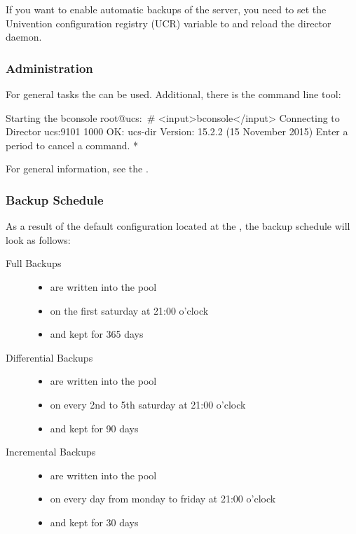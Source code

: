 If you want to enable automatic backups of the server, you need to set the Univention configuration registry (UCR) variable  to  and reload the director daemon.


\subsubsection{Administration}

For general tasks the  can be used.
Additional, there is the  command line tool:

\begin{commands}{Starting the bconsole}
root@ucs:~# <input>bconsole</input>
Connecting to Director ucs:9101
1000 OK: ucs-dir Version: 15.2.2 (15 November 2015)
Enter a period to cancel a command.
*
\end{commands}

For general information, see the .


\subsubsection{Backup Schedule}

As a result of the default configuration located at the , the backup schedule will look as follows:

\begin{description}
  \item[Full Backups]
    \begin{itemize}
	\item are written into the  pool
	\item on the first saturday at 21:00 o'clock
	\item and kept for 365 days
    \end{itemize}
 \item[Differential Backups]
     \begin{itemize}
        \item are written into the  pool
        \item on every 2nd to 5th saturday at 21:00 o'clock
        \item and  kept for 90 days
    \end{itemize}
 \item[Incremental Backups]
     \begin{itemize}
        \item are written into the  pool
        \item on every day from monday to friday at 21:00 o'clock
        \item and kept for 30 days
    \end{itemize}
\end{description}

